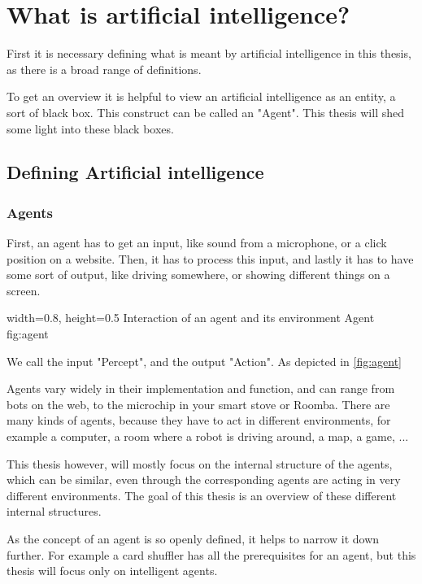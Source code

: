 \chapter{What is artificial intelligence?}
First it is necessary defining what is meant by artificial intelligence in this thesis, as there is a broad range of definitions.%

To get an overview it is helpful to view an artificial intelligence as an entity, a sort of black box. This construct can be called an "Agent". 
This thesis will shed some light into these black boxes.

\section{Defining Artificial intelligence}
\subsection{Agents}
First, an agent has to get an input, like sound from a microphone, or a click position on a website.
Then, it has to process this input, 
and lastly it has to have some sort of output, like driving somewhere, or showing different things on a screen.

    {width=0.8\textwidth, height=0.5\textheight} %
    {Interaction of an agent and its environment}   %
    {Agent}   %
    {fig:agent}    %

We call the input "Percept", and the output "Action". As depicted in \ref{fig:agent}

Agents vary widely in their implementation and function, and can range from bots on the web, to the microchip in your smart stove or Roomba. 
There are many kinds of agents, because they have to act in different environments, for example a computer, a room where a robot is driving around, a map, a game, ...

This thesis however, will mostly focus on the internal structure of the agents, which can be similar, even through the corresponding agents are acting in very different environments.
The goal of this thesis is an overview of these different internal structures.

As the concept of an agent is so openly defined, it helps to narrow it down further. For example a card shuffler has all the prerequisites for an agent, but this thesis will focus only on intelligent agents.

